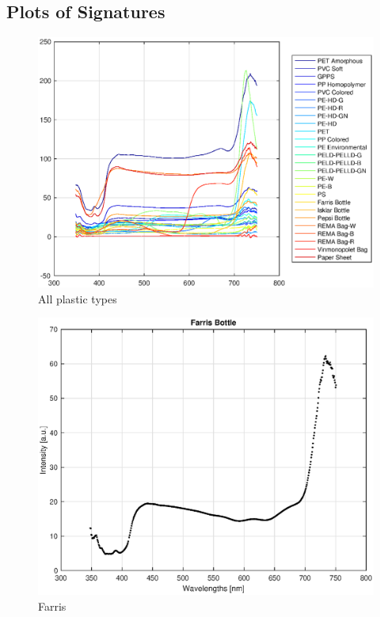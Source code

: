 \begin{appendices}
\chapter{Plots of Signatures}
\label{app:signatures}

\begin{figure}
    \centering
    \includegraphics[width = 12cm]{Images/appendix/All.eps}
    \caption{All plastic types}
    \label{fig:all}
\end{figure}

\begin{figure}
    \centering
    \includegraphics[width = 12cm]{Images/appendix/farris.eps}
    \caption{Farris}
    \label{fig:my_label}
\end{figure}


\end{appendices}
